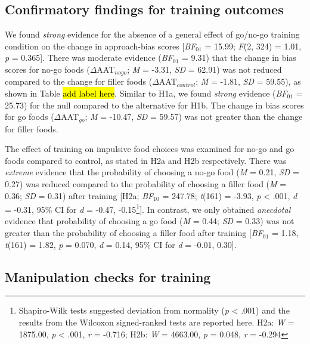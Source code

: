 \documentclass[man,floatsintext]{apa6}
\let\rmarkdownfootnote\footnote%
\def\footnote{\protect\rmarkdownfootnote}
\begin{document}
\subsection{Confirmatory findings for training
outcomes}\label{confirmatory-findings-for-training-outcomes}

\par

We found \emph{strong} evidence for the absence of a general effect of
go/no-go training condition on the change in approach-bias scores
{[}\emph{BF}\(_{01}\) = 15.99; \emph{F}(2, 324) = 1.01, \emph{p} =
0.365{]}. There was moderate evidence (\emph{BF}\(_{01}\) = 9.31) that
the change in bias scores for no-go foods (\(\Delta\)AAT\(_{nogo}\);
\emph{M} = -3.31, \emph{SD} = 62.91) was not reduced compared to the
change for filler foods (\(\Delta\)AAT\(_{control}\); \emph{M} = -1.81,
\emph{SD} = 59.55), as shown in Table \hl{add label here}. Similar to
H1a, we found \emph{strong} evidence (\emph{BF}\(_{01}\) = 25.73) for
the null compared to the alternative for H1b. The change in bias scores
for go foods (\(\Delta\)AAT\(_{go}\); \emph{M} = -10.47, \emph{SD} =
59.57) was not greater than the change for filler foods.

\par

The effect of training on impulsive food choices was examined for no-go
and go foods compared to control, as stated in H2a and H2b respectively.
There was \emph{extreme} evidence that the probability of choosing a
no-go food (\emph{M} = 0.21, \emph{SD} = 0.27) was reduced compared to
the probability of choosing a filler food (\emph{M} = 0.36; \emph{SD} =
0.31) after training {[}H2a; \emph{BF}\(_{10}\) = 247.78; \emph{t}(161)
= -3.93, \emph{p} \textless{} .001, \emph{d} = -0.31, 95\% CI for
\emph{d} = -0.47,
-0.15\footnote{Shapiro-Wilk tests suggested deviation from normality (\textit{p} < .001) and the results from the Wilcoxon signed-ranked tests are reported here. H2a: \textit{W} = 1875.00, \textit{p} < .001, \textit{r} = -0.716; H2b: \textit{W} = 4663.00, \textit{p} = 0.048, \textit{r} = -0.294}{]}.
In contrast, we only obtained \emph{anecdotal} evidence that probability
of choosing a go food (\emph{M} = 0.44; \emph{SD} = 0.33) was not
greater than the probability of choosing a filler food after training
{[}\emph{BF}\(_{01}\) = 1.18, \emph{t}(161) = 1.82, \emph{p} = 0.070,
\emph{d} = 0.14, 95\% CI for \emph{d} = -0.01, 0.30{]}.

\subsection{Manipulation checks for
training}\label{manipulation-checks-for-training}
\end{document}
